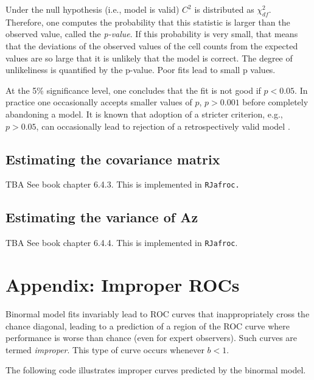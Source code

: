\documentclass[
]{book}
\begin{document}
Under the null hypothesis (i.e., model is valid) \(C^2\) is distributed as \(\chi_{df}^{2}\). Therefore, one computes the probability that this statistic is larger than the observed value, called the \emph{p-value}. If this probability is very small, that means that the deviations of the observed values of the cell counts from the expected values are so large that it is unlikely that the model is correct. The degree of unlikeliness is quantified by the p-value. Poor fits lead to small p values.

At the 5\% significance level, one concludes that the fit is not good if \(p < 0.05\). In practice one occasionally accepts smaller values of \(p\), \(p > 0.001\) before completely abandoning a model. It is known that adoption of a stricter criterion, e.g., \(p > 0.05\), can occasionally lead to rejection of a retrospectively valid model \citep{RN300}.

\hypertarget{estimating-the-covariance-matrix}{%
\subsection{Estimating the covariance matrix}\label{estimating-the-covariance-matrix}}

TBA See book chapter 6.4.3. This is implemented in \texttt{RJafroc.}

\hypertarget{estimating-the-variance-of-az}{%
\subsection{Estimating the variance of Az}\label{estimating-the-variance-of-az}}

TBA See book chapter 6.4.4. This is implemented in \texttt{RJafroc}.

\hypertarget{binormal-model-improper-curves}{%
\section{Appendix: Improper ROCs}\label{binormal-model-improper-curves}}

Binormal model fits invariably lead to ROC curves that inappropriately cross the chance diagonal, leading to a prediction of a region of the ROC curve where performance is worse than chance (even for expert observers). Such curves are termed \emph{improper}. This type of curve occurs whenever \(b < 1\).

The following code illustrates improper curves predicted by the binormal model.
\end{document}
